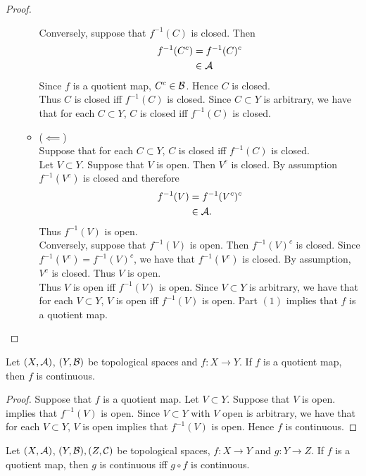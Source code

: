 \documentclass{book}
\begin{document}
\begin{proof}
\begin{enumerate}
\begin{itemize}
				Conversely, suppose that $f^{-1}(C)$ is closed. Then 
				\begin{align*}
					f^{-1}(C^c) 
					& = f^{-1}(C)^c \\
					& \in \mathcal{A} 
				\end{align*}
				Since $f$ is a quotient map, $C^c \in \mathcal{B}$. Hence $C$ is closed. \\
				Thus $C$ is closed iff $f^{-1}(C)$ is closed. Since $C \subset Y$ is arbitrary, we have that for each $C \subset Y$, $C$ is closed iff $f^{-1}(C)$ is closed.
				\item ($\impliedby$) \\
				Suppose that for each $C \subset Y$, $C$ is closed iff $f^{-1}(C)$ is closed. \\
				Let $V \subset Y$. Suppose that $V$ is open. Then $V^c$ is closed. By assumption $f^{-1}(V^c)$ is closed and therefore
				\begin{align*}
					f^{-1}(V)
					& = f^{-1}(V^c)^c \\
					& \in \mathcal{A}. 
				\end{align*}
				Thus $f^{-1}(V)$ is open. \\
				Conversely, suppose that $f^{-1}(V)$ is open. Then $f^{-1}(V)^c$ is closed. Since $f^{-1}(V^c) = f^{-1}(V)^c$, we have that $f^{-1}(V^c)$ is closed. By assumption, $V^c$ is closed. Thus $V$ is open. \\
				Thus $V$ is open iff $f^{-1}(V)$ is open. Since $V \subset Y$ is arbitrary, we have that for each $V \subset Y$, $V$ is open iff $f^{-1}(V)$ is open. Part $(1)$ implies that $f$ is a quotient map.
			\end{itemize}
		\end{enumerate}
	\end{proof}
	
	\begin{ex} 
	Let $(X, \mathcal{A})$, $(Y, \mathcal{B})$ be topological spaces and $f:X \rightarrow Y$. If $f$ is a quotient map, then $f$ is continuous.
	\end{ex}
	
	\begin{proof}
	Suppose that $f$ is a quotient map. Let $V \subset Y$. Suppose that $V$ is open.  implies that $f^{-1}(V)$ is open. Since $V \subset Y$ with $V$ open is arbitrary, we have that for each $V \subset Y$, $V$ is open implies that $f^{-1}(V)$ is open. Hence $f$ is continuous.  
	\end{proof}

	\begin{ex} 
		Let $(X, \mathcal{A})$, $(Y, \mathcal{B}), (Z, \mathcal{C})$ be topological spaces, $f:X \rightarrow Y$ and $g: Y \rightarrow Z$. If $f$ is a quotient map, then $g$ is continuous iff $g \circ f$ is continuous.
	\end{ex}
	
\end{document}
